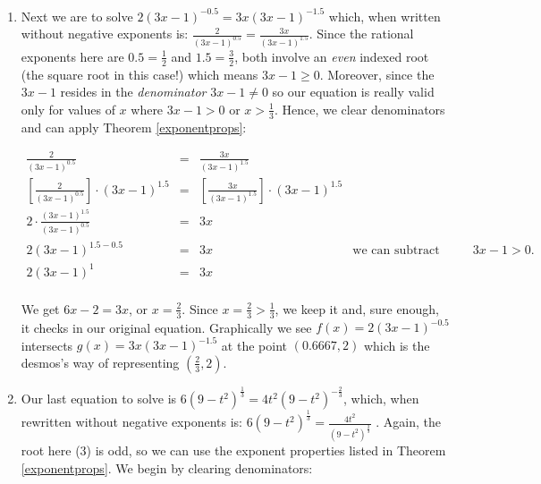 \documentclass{ximera}
\begin{document}
\begin{example}
\begin{enumerate}
\begin{center}
\end{center} 


\item Next we are to solve $2(3x-1)^{-0.5}  = 3x (3x-1)^{-1.5}$ which, when written without negative exponents is: $\frac{2}{(3x-1)^{0.5}} = \frac{3x}{(3x-1)^{1.5}}$.  Since the rational exponents here are $0.5 = \frac{1}{2}$ and $1.5 = \frac{3}{2}$, both involve an \textit{even} indexed root (the square root in this case!) which means $3x-1 \geq 0$.  Moreover, since the $3x-1$ resides in the \textit{denominator} $3x - 1 \neq 0$ so our equation is really valid only for values of $x$ where $3x-1>0$ or $x > \frac{1}{3}$.  Hence, we clear denominators and can apply Theorem \ref{exponentprops}:

\[ \begin{array}{rclr}

\frac{2}{(3x-1)^{0.5}} & = & \frac{3x}{(3x-1)^{1.5}} & \\

\left[ \frac{2}{(3x-1)^{0.5}} \right] \cdot (3x-1)^{1.5} & = & \left[  \frac{3x}{(3x-1)^{1.5}} \right ] \cdot (3x-1)^{1.5} & \\

2 \cdot \frac{(3x-1)^{1.5}}{(3x-1)^{0.5}} & = & 3x & \\

2 (3x-1)^{1.5-0.5} & = & 3x & \text{we can subtract exponents since $3x-1 > 0$.} \\

2 (3x-1)^{1} & = & 3x & \\  \end{array} \]

We get $6x-2 = 3x$, or $x = \frac{2}{3}$.  Since $x = \frac{2}{3} > \frac{1}{3}$, we keep it and, sure enough, it  checks in our original equation. Graphically we see $f(x)=2(3x-1)^{-0.5}$ intersects $g(x) = 3x (3x-1)^{-1.5}$ at the point $(0.6667, 2)$ which is the desmos's way of representing $\left(\frac{2}{3}, 2\right)$.

\begin{center}
\end{center}

\item  Our last equation to solve is $6(9-t^2)^{\frac{1}{3}} = 4t^2 (9-t^2)^{-\frac{2}{3}}$, which, when rewritten without negative exponents is: $6(9-t^2)^{\frac{1}{3}} = \frac{4t^2}{(9-t^2)^{\frac{2}{3}}}$  .   Again, the root here ($3$) is odd, so we can use the exponent properties listed in Theorem \ref{exponentprops}.   We begin by clearing denominators: 



\end{enumerate}
\end{example}
\end{document}
